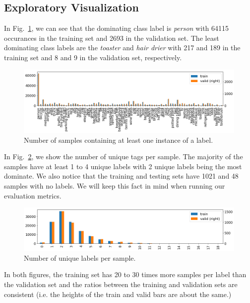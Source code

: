 \documentclass[12pt,journal,compsoc]{IEEEtran}
\begin{document}
\subsection{Exploratory Visualization}




In Fig.~\ref{coco_label_counts}, we can see that the dominating class label is \textit{person} with 64115 occurances in the training set and 2693 in the validation set. The least dominating class labels are the \textit{toaster} and \textit{hair drier} with 217 and 189 in the training set and 8 and 9 in the validation set, respectively.
\begin{figure}[!t]
\normalsize
\includegraphics[width=\linewidth]{mscoco_label_counts.png}
\caption{Number of samples containing at least one instance of a label.}
\label{coco_label_counts}
\vspace*{4pt}
\end{figure}
In Fig.~\ref{coco_n_images_with_k_tags}, we show the number of unique tags per sample.  The majority of the samples have at least 1 to 4 unique labels with 2 unique labels being the most dominate.  We also notice that the training and testing sets have 1021 and 48 samples with no labels. We will keep this fact in mind when running our evaluation metrics.
\begin{figure}[!t]
\normalsize
\includegraphics[width=\linewidth]{mscoco_n_images_with_k_tags.png}
\caption{Number of unique labels per sample.}
\label{coco_n_images_with_k_tags}
\vspace*{4pt}
\end{figure}
In both figures, the training set has 20 to 30 times more samples per label than the validation set and the ratios between the training and validation sets are consistent (i.e. the heights of the train and valid bars are about the same.)
\end{document}
